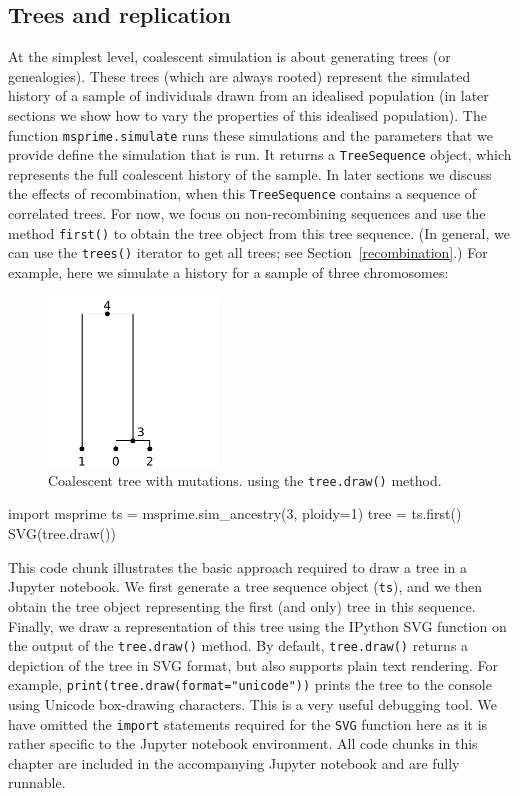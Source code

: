 \documentclass[graybox]{svmult}
\begin{document}
\subsection{Trees and replication}
At the simplest level, coalescent simulation is about generating trees (or genealogies).
These trees (which are always rooted) represent the simulated history of a sample of individuals
drawn from an idealised population (in later sections we show how to
vary the properties of this idealised population). The function
\texttt{msprime.simulate} runs these simulations and the parameters
that we provide define the simulation that is
run. It returns a \texttt{TreeSequence} object, which represents the
full coalescent history of the sample. In later sections we discuss the
effects of recombination, when this \texttt{TreeSequence} contains a
sequence of correlated trees. For now, we focus on non-recombining sequences and
use the method \texttt{first()} to obtain the
tree object from this tree sequence. (In general, we can use the \texttt{trees()} iterator
to get all trees; see Section~\ref{recombination}.) For example, here we simulate a
history for a sample of three chromosomes:

\begin{figure}[t]
\begin{center}
\includegraphics[width=0.4\textwidth]{images/plot_1.pdf}
\end{center}
\caption{\label{fig-simple-tree} Coalescent tree with mutations.
using the \texttt{tree.draw()} method.}
\end{figure}

\begin{pythoncode}
import msprime
ts = msprime.sim_ancestry(3, ploidy=1)
tree = ts.first()
SVG(tree.draw())
\end{pythoncode}

This code chunk illustrates the basic approach required to draw a tree
in a Jupyter notebook. We first generate a tree sequence object (\texttt{ts}),
and we then obtain the tree object representing the first (and only)
tree in this sequence. Finally, we draw a representation of this tree
using the IPython SVG function on the output of the \texttt{tree.draw()}
method. By default, \texttt{tree.draw()} returns a depiction of the tree
in SVG format, but also supports plain text rendering. For example,
\texttt{print(tree.draw(format="unicode"))} prints the tree to the console
using Unicode box-drawing characters. This is a very useful debugging tool.
We have omitted the \texttt{import} statements required for the \texttt{SVG}
function here as it is rather specific to the Jupyter notebook environment.
All code chunks in this chapter are included in the accompanying Jupyter
notebook and are fully runnable.
\end{document}
